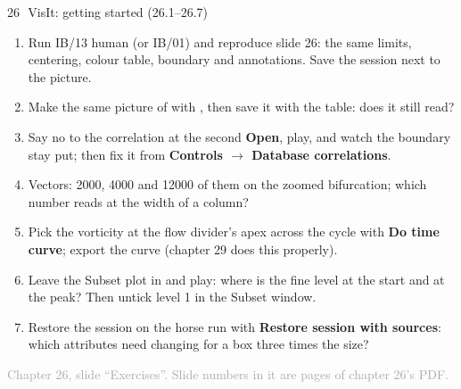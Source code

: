 \documentclass[aspectratio=169,11pt]{beamer}
\newcommand{\sourcecredit}[1]{\vfill\begin{flushright}\tiny\textcolor{DarkGray}{#1}\end{flushright}}
\providecommand{\gui}[1]{\textsf{\textbf{#1}}}
\begin{document}
\begin{frame}{26\,\textbullet\ VisIt: getting started (26.1--26.7)}
\label{fr:c26x1}
\footnotesize
\begin{enumerate}
  \item[26.1] Run IB/13 human (or IB/01) and reproduce slide 26: the same limits, centering, colour table, boundary and annotations. Save the session next to the picture.
  \item[26.2] Make the same picture of  with , then save it with the  table: does it still read?
  \item[26.3] Say no to the correlation at the second \gui{Open}, play, and watch the boundary stay put; then fix it from \gui{Controls $\to$ Database correlations}.
  \item[26.4] Vectors: 2000, 4000 and 12000 of them on the zoomed bifurcation; which number reads at the width of a column?
  \item[26.5] Pick the vorticity at the flow divider's apex across the cycle with \gui{Do time curve}; export the curve (chapter 29 does this properly).
  \item[26.6] Leave the  Subset plot in and play: where is the fine level at the start and at the peak? Then untick level 1 in the Subset window.
  \item[26.7] Restore the session on the horse run with \gui{Restore session with sources}: which attributes need changing for a box three times the size?
\end{enumerate}
\sourcecredit{Chapter 26, slide ``Exercises''. Slide numbers in it are pages of chapter 26's PDF.}
\end{frame}
\end{document}
